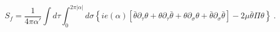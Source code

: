 \begin{equation}
S_f = \frac{1}{4 \pi \alpha'} \int d\tau \int_{0}^{2 \pi |\alpha|} d
\sigma \left\{i e(\alpha) \left[{\bar{\theta}} \partial_{\tau} \theta +
\theta \partial_{\tau} {\bar{\theta}} + \theta \partial_{\sigma} \theta + 
{\bar{\theta}} \partial_{\sigma} {\bar{\theta}} \right] - 2 \mu 
{\bar{\theta}} \Pi \theta \right\}~.
\label{act567}
\end{equation}

